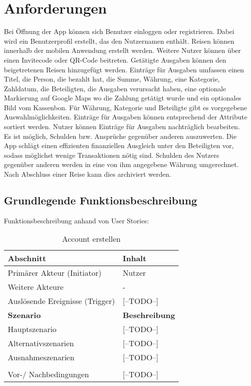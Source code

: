 \section{Anforderungen}

Bei Öffnung der App können sich Benutzer einloggen oder registrieren. Dabei wird ein Benutzerprofil erstellt, das den Nutzernamen enthält. Reisen können innerhalb der mobilen Anwendung erstellt werden. Weitere Nutzer können über einen Invitecode oder QR-Code beitreten. Getätigte Ausgaben können den beigetretenen Reisen hinzugefügt werden. Einträge für Ausgaben umfassen einen Titel, die Person, die bezahlt hat, die Summe, Währung, eine Kategorie, Zahldatum, die Beteiligten, die Ausgaben verursacht haben, eine optionale Markierung auf Google Maps wo die Zahlung getätigt wurde und ein optionales Bild vom Kassenbon. Für Währung, Kategorie und Beteiligte gibt es vorgegebene Auswahlmöglichkeiten. Einträge für Ausgaben können entsprechend der Attribute sortiert werden. Nutzer können Einträge für Ausgaben nachträglich bearbeiten. Es ist möglich, Schulden bzw. Ansprüche gegenüber anderen auszuwerten. Die App schlägt einen effizienten finanziellen Ausgleich unter den Beteiligten vor, sodass möglichst wenige Transaktionen nötig sind. Schulden des Nutzers gegenüber anderen werden in eine von ihm angegebene Währung umgerechnet. Nach Abschluss einer Reise kann dies archiviert werden.

\subsection{Grundlegende Funktionsbeschreibung}

Funktionsbeschreibung anhand von User Stories:

\begin{table}[H]
\caption{Account erstellen}
\begin{tabularx}{0.95\textwidth}{ |X|X| }
\hline
\rowcolor{gray} \textbf{Abschnitt} & \textbf{Inhalt} \\
\hline
	Primärer Akteur (Initiator) & Nutzer \\
\hline
	Weitere Akteure & - \\
\hline
	Auslösende Ereignisse (Trigger) & [--TODO--] \\
\hline
\rowcolor{lightgray} \textbf{Szenario} & \textbf{Beschreibung} \\
\hline
	Hauptszenario & [--TODO--] \\
\hline
  	Alternativszenarien & [--TODO--] \\
\hline
  	Ausnahmeszenarien & [--TODO--] \\
\hline
\rowcolor{lightgray} & \\
\hline
  	Vor-/ Nachbedingungen & [--TODO--] \\
\hline
\end{tabularx}
\end{table}


